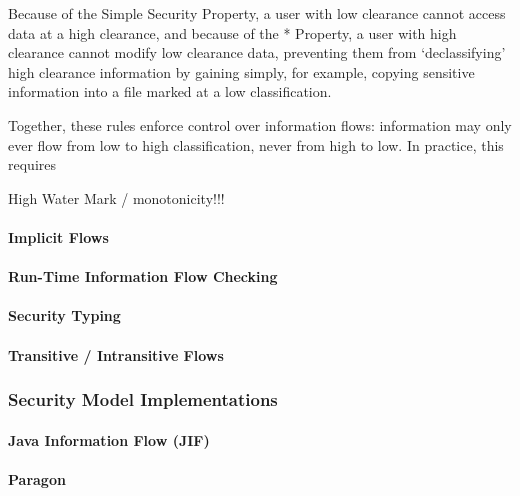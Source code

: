 	Because of the Simple Security Property, a user with low clearance cannot access data at a high clearance, and because of the * Property, a user with high clearance cannot modify low clearance data, preventing them from `declassifying' high clearance information by gaining simply, for example, copying sensitive information into a file marked at a low classification.
	
	Together, these rules enforce control over information flows: information may only ever flow from low to high classification, never from high to low. In practice, this requires 
	
	High Water Mark / monotonicity!!! 
	
	\cite{denning1976lattice}
	
	\cite{sandhu1994access}
	
	\paragraph{Implicit Flows}
	
	\paragraph{Run-Time Information Flow Checking}

	\paragraph{Security Typing}
	
	\paragraph{Transitive / Intransitive Flows}

\subsubsection{Security Model Implementations}

	\paragraph{Java Information Flow (JIF)}
	
	\paragraph{Paragon}